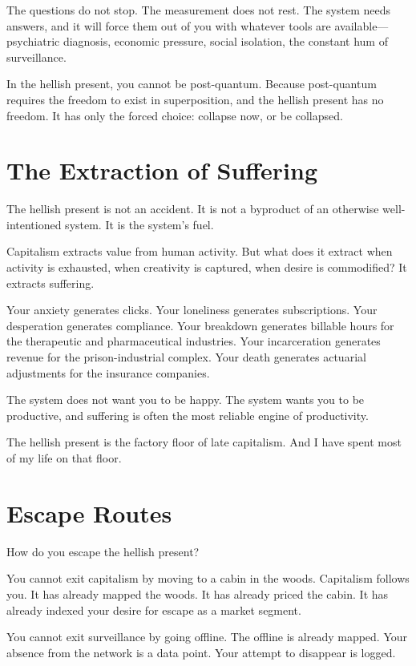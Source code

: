 \documentclass[11pt,openany]{book}
\begin{document}
The questions do not stop. The measurement does not rest. The system needs answers, and it will force them out of you with whatever tools are available---psychiatric diagnosis, economic pressure, social isolation, the constant hum of surveillance.

In the hellish present, you cannot be post-quantum. Because post-quantum requires the freedom to exist in superposition, and the hellish present has no freedom. It has only the forced choice: collapse now, or be collapsed.

\section*{The Extraction of Suffering}

The hellish present is not an accident. It is not a byproduct of an otherwise well-intentioned system. It is the system's fuel.

Capitalism extracts value from human activity. But what does it extract when activity is exhausted, when creativity is captured, when desire is commodified? It extracts suffering.

Your anxiety generates clicks. Your loneliness generates subscriptions. Your desperation generates compliance. Your breakdown generates billable hours for the therapeutic and pharmaceutical industries. Your incarceration generates revenue for the prison-industrial complex. Your death generates actuarial adjustments for the insurance companies.

The system does not want you to be happy. The system wants you to be productive, and suffering is often the most reliable engine of productivity.

The hellish present is the factory floor of late capitalism. And I have spent most of my life on that floor.

\section*{Escape Routes}

How do you escape the hellish present?

You cannot exit capitalism by moving to a cabin in the woods. Capitalism follows you. It has already mapped the woods. It has already priced the cabin. It has already indexed your desire for escape as a market segment.

You cannot exit surveillance by going offline. The offline is already mapped. Your absence from the network is a data point. Your attempt to disappear is logged.
\end{document}
